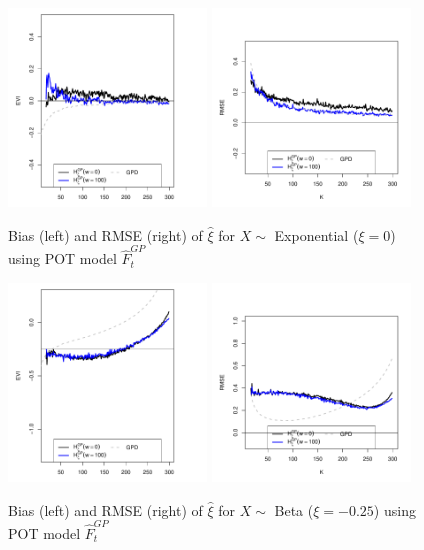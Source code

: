 \documentclass[a4paper,11pt]{article}
\begin{document}
\begin{figure}[!ht]
	\centering
	\includegraphics[width=0.47\textwidth]{EGP_exp_xi_m16.pdf}
	\includegraphics[width=0.47\textwidth]{EGP_exp_rmse_m16.pdf}        
	\caption{\small Bias (left) and RMSE (right) of $\hat{\xi}$ for $X \sim$ Exponential ($\xi=0$) using POT model $\hat{F}^{GP}_t$} 
\end{figure}

\begin{figure}[!ht]
	\centering
	\includegraphics[width=0.47\textwidth]{EGP_beta_xi_m16.pdf}
	\includegraphics[width=0.47\textwidth]{EGP_beta_rmse_m16.pdf}        
	\caption{\small Bias (left) and RMSE (right) of $\hat{\xi}$ for $X \sim$ Beta ($\xi=-0.25$) using POT model $\hat{F}^{GP}_t$} 
\end{figure}
\end{document}
